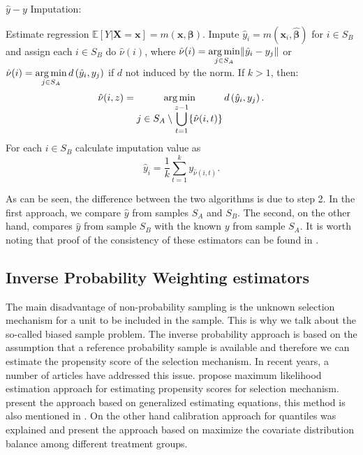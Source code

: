 \documentclass[
]{jss}
\begin{document}
\begin{algorithm}[H]
\caption{$\hat{y}-y$ Imputation:}
\label{algo-4}
\begin{algorithmic}[1]
\State Estimate regression $\mathbb{E}[Y|\boldsymbol{X}=\boldsymbol{x}]=m(\boldsymbol{x}, \boldsymbol{\beta})$.\;
\State Impute $\hat{y}_{i}=m\left(\boldsymbol{x}_{i},\hat{\boldsymbol{\beta}}\right)$ 
for $i \in S_{B}$ and assign each 
$i \in S_{B}$ do $\hat{\nu}(i)$, where
$\displaystyle \hat{\nu}(i)=
\operatornamewithlimits{arg\,min}_{j \in S_{A}}\lVert \hat{y}_{i}-y_{j}\rVert$ or
$\displaystyle \hat{\nu}(i)=
\operatornamewithlimits{arg\,min}_{j \in S_{A}}d\left(\hat{y}_{i},y_{j}\right)$ 
if $d$ not induced by the norm.\;
\State If $k>1$, then:
$$\hat{\nu}(i, z) = \operatornamewithlimits{arg\,min}_{\displaystyle j \in S_{A} \setminus \bigcup_{t=1}^{z-1}
\{\hat{\nu}(i, t)\}}
d\left(\hat{y}_{i},y_{j}\right).$$
\State For each $i \in S_B$ calculate imputation value as
$$
\hat{y}_i = \frac{1}{k}\sum_{t=1}^{k}y_{\hat{\nu}(i, t)}.
$$
\end{algorithmic}
\end{algorithm}

As can be seen, the difference between the two algorithms is due to step
2. In the first approach, we compare \(\hat{y}\) from samples \(S_A\)
and \(S_B\). The second, on the other hand, compares \(\hat{y}\) from
sample \(S_B\) with the known \(y\) from sample \(S_A\). It is worth
noting that proof of the consistency of these estimators can be found in
\citet{Beres}.

\hypertarget{inverse-probability-weighting-estimators}{%
\subsection{Inverse Probability Weighting
estimators}\label{inverse-probability-weighting-estimators}}

The main disadvantage of non-probability sampling is the unknown
selection mechanism for a unit to be included in the sample. This is why
we talk about the so-called biased sample problem. The inverse
probability approach is based on the assumption that a reference
probability sample is available and therefore we can estimate the
propensity score of the selection mechanism. In recent years, a number
of articles have addressed this issue. \cite{chen2020doubly} propose
maximum likelihood estimation approach for estimating propensity scores
for selection mechanism. \cite{wu2022statistical} present the approach
based on generalized estimating equations, this method is also mentioned
in \cite{yang_doubly_2020}. On the other hand calibration approach for
quantiles was explained \cite{beresewicz2024inference} and
\cite{santanna_covariate_2022} present the approach based on maximize
the covariate distribution balance among different treatment groups.
\end{document}
